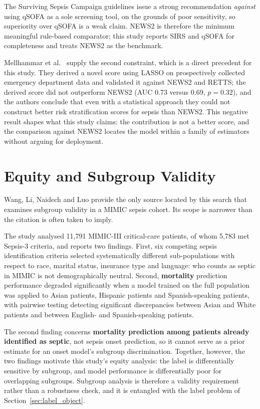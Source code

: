 The Surviving Sepsis Campaign guidelines \cite{evans2021ssc} issue a strong
recommendation \emph{against} using qSOFA as a sole screening tool, on the
grounds of poor sensitivity, so superiority over qSOFA is a weak claim. NEWS2
is therefore the minimum meaningful rule-based comparator; this study reports
SIRS and qSOFA for completeness and treats NEWS2 as the benchmark.

Mellhammar et al.\ \cite{mellhammar2020news2} supply the second constraint,
which is a direct precedent for this study. They derived a novel score using LASSO on prospectively collected emergency
department data and validated it against NEWS2 and RETTS; the derived score did
not outperform NEWS2 (AUC 0.73 versus 0.69, $p = 0.32$), and the authors
conclude that even with a statistical approach they could not construct better
risk stratification scores for sepsis than NEWS2. This negative result shapes
what this study claims: the contribution is not a better score, and the
comparison against NEWS2 locates the model within a family of estimators
without arguing for deployment.


\section{Equity and Subgroup Validity}
\label{sec:equity_lit}

Wang, Li, Naidech and Luo \cite{wang2022equity} provide the only source located
by this search that examines subgroup validity in a MIMIC sepsis cohort. Its
scope is narrower than the citation is often taken to imply.

The study \cite{wang2022equity} analysed 11,791 MIMIC-III critical-care
patients, of whom 5,783 met Sepsis-3 criteria, and reports two findings. First, six competing sepsis
identification criteria selected systematically different sub-populations with
respect to race, marital status, insurance type and language: who counts as
septic in MIMIC is not demographically neutral. Second, \textbf{mortality}
prediction performance degraded significantly when a model trained on the full
population was applied to Asian patients, Hispanic patients and
Spanish-speaking patients, with pairwise testing detecting significant
discrepancies between Asian and White patients and between English- and
Spanish-speaking patients.

The second finding concerns \textbf{mortality prediction among patients already
identified as septic}, not sepsis onset prediction, so it cannot serve as a
prior estimate for an onset model's subgroup discrimination. Together, however,
the two findings motivate this study's equity analysis: the label is
differentially sensitive by subgroup, and model performance is differentially
poor for overlapping subgroups. Subgroup analysis is therefore a validity
requirement rather than a robustness check, and it is entangled with the label
problem of Section~\ref{sec:label_object}.

